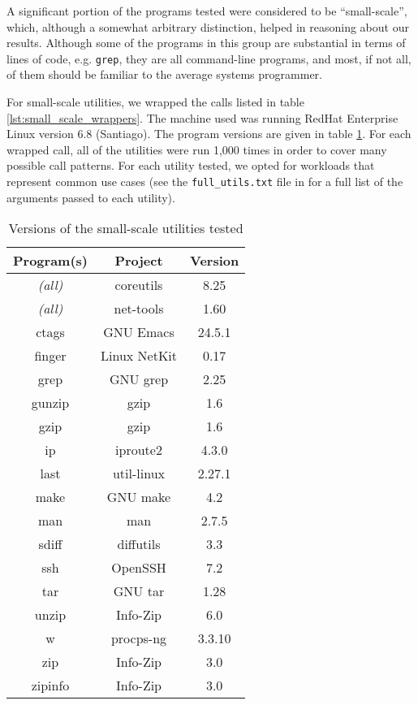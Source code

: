 A significant portion of the programs tested were considered to be ``small-scale'', which, although a somewhat arbitrary distinction, helped in reasoning about our results. Although some of the programs in this group are substantial in terms of lines of code, e.g. \texttt{grep}, they are all command-line programs, and most, if not all, of them should be familiar to the average systems programmer.

For small-scale utilities, we wrapped the calls listed in table \ref{lst:small_scale_wrappers}. The machine used was running RedHat Enterprise Linux version 6.8 (Santiago). The program versions are given in table \ref{tab:small_scale_versions}. For each wrapped call, all of the utilities were run 1,000 times in order to cover many possible call patterns. For each utility tested, we opted for workloads that represent common use cases (see the \texttt{full\_utils.txt} file in \cite{github} for a full list of the arguments passed to each utility).

\begin{table}[h!]
\begin{center}
\begin{tabular}{ |c|c|c| }
\hline
\multicolumn{1}{|c|}{\textbf{Program(s)}} & \multicolumn{1}{c|}{\textbf{Project}} & \multicolumn{1}{c|}{\textbf{Version}} \\
\hline
\em{(all)} & coreutils  & 8.25 \\ 
\em{(all)} & net-tools & 1.60 \\
ctags&GNU Emacs & 24.5.1 \\
finger&Linux NetKit  & 0.17 \\
grep & GNU grep & 2.25 \\
gunzip & gzip & 1.6 \\
gzip & gzip & 1.6 \\
ip&iproute2 & 4.3.0 \\
last & util-linux & 2.27.1 \\
make & GNU make & 4.2 \\
man & man & 2.7.5 \\
sdiff&diffutils & 3.3 \\
ssh&OpenSSH & 7.2 \\
tar&GNU tar & 1.28 \\
unzip&Info-Zip  & 6.0 \\
w&procps-ng & 3.3.10 \\
zip&Info-Zip & 3.0 \\
zipinfo&Info-Zip & 3.0 \\
\hline
\end{tabular}
\caption{Versions of the small-scale utilities tested}
\label{tab:small_scale_versions}
\end{center}
\end{table}

